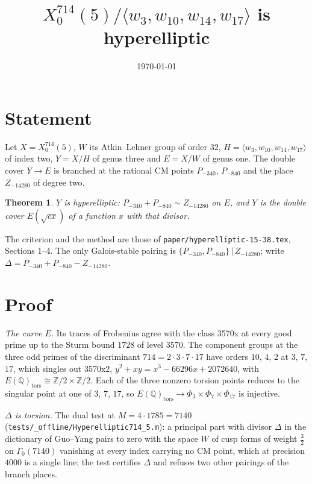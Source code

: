 \documentclass[11pt,reqno]{amsart}
\theoremstyle{plain}
\newtheorem{theorem}{Theorem}[section]
\theoremstyle{definition}
\newcommand{\Q}{\mathbb{Q}}
\newcommand{\Z}{\mathbb{Z}}
\begin{document}
\title{$X_0^{714}(5)/\langle w_3,w_{10},w_{14},w_{17}\rangle$ is hyperelliptic}
\author{}
\date{\today}
\maketitle

\section{Statement}

Let $X=X_0^{714}(5)$, $W$ its Atkin--Lehner group of order $32$, $H=\langle w_3,w_{10},w_{14},w_{17}\rangle$ of
index two, $Y=X/H$ of genus three and $E=X/W$ of genus one. The double cover $Y\to E$ is branched at the rational
CM points $P_{-340}$, $P_{-840}$ and the place $Z_{-14280}$ of degree two.

\begin{theorem}\label{thm:main}
$Y$ is hyperelliptic: $P_{-340}+P_{-840}\sim Z_{-14280}$ on $E$, and $Y$ is the double cover $E(\sqrt{cx})$ of a
function $x$ with that divisor.
\end{theorem}

The criterion and the method are those of \texttt{paper/hyperelliptic-15-38.tex}, Sections 1--4. The only
Galois-stable pairing is $\{P_{-340},P_{-840}\}\,|\,Z_{-14280}$; write $\Delta=P_{-340}+P_{-840}-Z_{-14280}$.

\section{Proof}

\emph{The curve $E$.} Its traces of Frobenius agree with the class 3570x at every good prime up to the Sturm
bound $1728$ of level $3570$. The component groups at the three odd primes of the discriminant $714=2\cdot3\cdot7\cdot17$
have orders $10$, $4$, $2$ at $3$, $7$, $17$, which singles out 3570x2, $y^2+xy=x^3-66296x+2072640$, with
$E(\Q)_{\mathrm{tors}}\cong\Z/2\times\Z/2$. Each of the three nonzero torsion points reduces to the singular point
at one of $3$, $7$, $17$, so $E(\Q)_{\mathrm{tors}}\to\Phi_3\times\Phi_7\times\Phi_{17}$ is injective.

\emph{$\Delta$ is torsion.} The dual test at $M=4\cdot1785=7140$ (\texttt{tests/\_offline/Hyperelliptic714\_5.m}): a principal part with divisor $\Delta$ in the dictionary of Guo--Yang pairs to zero with the space $W$ of cusp forms of weight $\tfrac32$ on $\Gamma_0(7140)$ vanishing at every index carrying no CM point, which at precision $4000$ is a single line; the test certifies $\Delta$ and refuses two other pairings of the branch places.
\end{document}
